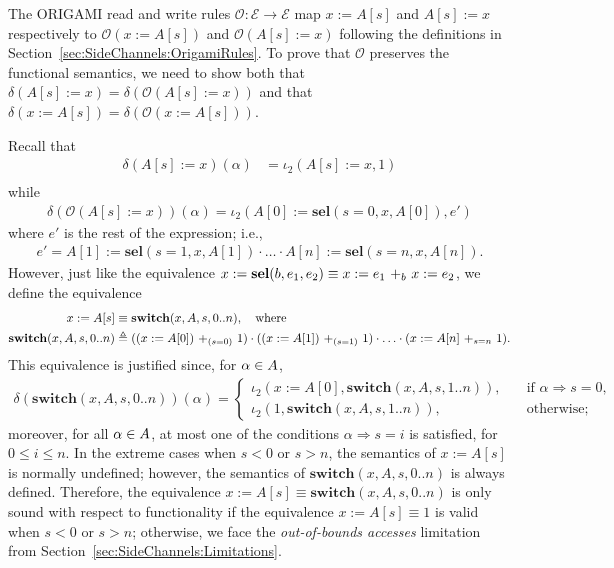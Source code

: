 The ORIGAMI read and write rules $\mathscr{O}\colon \mathscr{E}\rightarrow \mathscr{E}$ map $x:=A[s]$ and $A[s]:=x$ respectively to $\mathscr{O}(x:=A[s])$ and $\mathscr{O}(A[s]:=x)$ following the definitions in Section~\ref{sec:SideChannels:OrigamiRules}. To prove that $\mathscr{O}$ preserves the functional semantics, we need to show both that $\delta(A[s]:=x)= \delta(\mathscr{O}(A[s]:=x))$ and that $\delta(x:=A[s])=\delta(\mathscr{O}(x:=A[s]))$.

Recall that
\begin{align*}
    \delta(A[s]:=x)(\alpha)&=\iota_2(A[s]:=x,1)\\
\end{align*}
while
\begin{align*}
    \delta(\mathscr{O}(A[s]:=x))(\alpha)=\iota_2(A[0]:=\textbf{sel}(s=0,x,A[0]),e')
\end{align*}
where $e'$ is the rest of the expression; i.e., 
\begin{align*}
    e'=A[1]:=\textbf{sel}(s=1,x,A[1])\cdot\ldots \cdot A[n]:=\textbf{sel}(s=n,x,A[n]).
\end{align*}
However, just like the equivalence $x:=\textbf{sel}(b,e_1,e_2)\equiv \branch{b}{x:=e_1}{x:=e_2}$, we define the equivalence 
\begin{align*}
    x:=A[s]&\equiv \textbf{switch}(x,A,s,0..n),\quad \text{where}\\
    \textbf{switch}(x,A,s,0..n)&\triangleq(\branch{(s=0)}{(x:=A[0])}{1})\cdot (\branch{(s=1)}{(x:=A[1])}{1})\cdot \ldots \cdot (\branch{s=n}{x:=A[n]}{1}).
\end{align*}
This equivalence is justified since, for $\alpha \in \Atom$, 
\begin{align*}
    \delta(\textbf{switch}(x,A,s,0..n))(\alpha)=
    \begin{cases}
        \iota_2(x:=A[0],\textbf{switch}(x,A,s,1..n)),&\quad\text{if $\alpha \Rightarrow s=0$},\\
        \iota_2(1,\textbf{switch}(x,A,s,1..n)),&\quad\text{otherwise};
    \end{cases}
\end{align*}
moreover, for all $\alpha\in \Atom$, at most one of the conditions $\alpha \Rightarrow s=i$ is satisfied, for $0\leq i\leq n$. In the extreme cases when $s<0$ or $s>n$, the semantics of $x:=A[s]$ is normally undefined; however, the semantics of $\textbf{switch}(x,A,s,0..n)$ is always defined. Therefore, the equivalence $x:=A[s]\equiv \textbf{switch}(x,A,s,0..n)$ is only sound with respect to functionality if the equivalence $x:=A[s]\equiv 1$ is valid when $s<0$ or $s>n$; otherwise, we face the \emph{out-of-bounds accesses} limitation from Section~\ref{sec:SideChannels:Limitations}.


